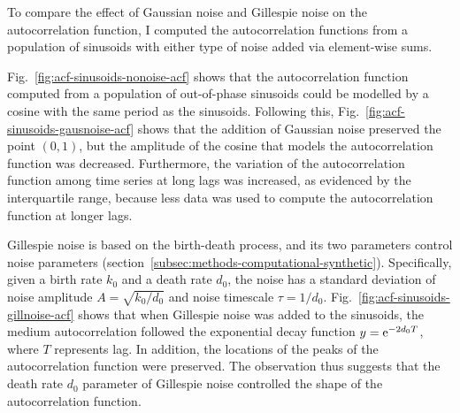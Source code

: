 To compare the effect of Gaussian noise and Gillespie noise on the autocorrelation function, I computed the autocorrelation functions from a population of sinusoids with either type of noise added via element-wise sums.


Fig.\ \ref{fig:acf-sinusoids-nonoise-acf} shows that the autocorrelation function computed from a population of out-of-phase sinusoids could be modelled by a cosine with the same period as the sinusoids.
Following this, Fig.\ \ref{fig:acf-sinusoids-gausnoise-acf} shows that the addition of Gaussian noise preserved the point $(0,1)$, but the amplitude of the cosine that models the autocorrelation function was decreased.
Furthermore, the variation of the autocorrelation function among time series at long lags was increased, as evidenced by the interquartile range, because less data was used to compute the autocorrelation function at longer lags.%

Gillespie noise is based on the birth-death process, and its two parameters control noise parameters (section~\ref{subsec:methods-computational-synthetic}).
Specifically, given a birth rate $k_{0}$ and a death rate $d_{0}$, the noise has a standard deviation of noise amplitude $A = \sqrt{k_{0}/d_{0}}$ and noise timescale $\tau = 1/d_{0}$.
Fig.\ \ref{fig:acf-sinusoids-gillnoise-acf} shows that when Gillespie noise was added to the sinusoids, the medium autocorrelation followed the exponential decay function $y = \mathrm{e}^{-2d_{0}T}$, where $T$ represents lag.
In addition, the locations of the peaks of the autocorrelation function were preserved.
The observation thus suggests that the death rate $d_{0}$ parameter of Gillespie noise controlled the shape of the autocorrelation function.


